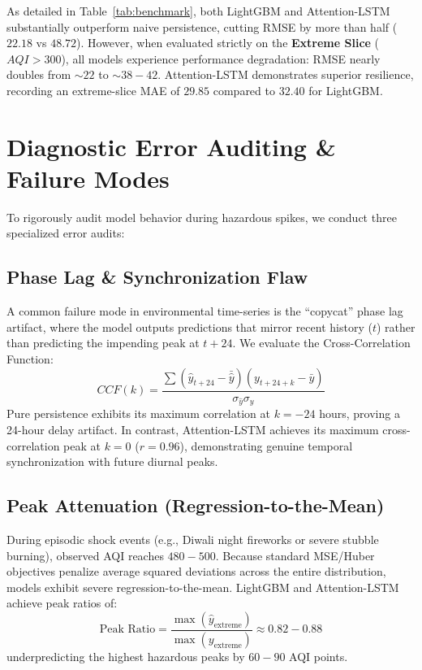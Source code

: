 \documentclass[10pt,journal,compsoc,twocolumn]{article}
\begin{document}
As detailed in Table~\ref{tab:benchmark}, both LightGBM and Attention-LSTM substantially outperform naive persistence, cutting RMSE by more than half ($22.18$ vs $48.72$). However, when evaluated strictly on the \textbf{Extreme Slice} ($AQI > 300$), all models experience performance degradation: RMSE nearly doubles from $\sim 22$ to $\sim 38 - 42$. Attention-LSTM demonstrates superior resilience, recording an extreme-slice MAE of $29.85$ compared to $32.40$ for LightGBM.

\section{Diagnostic Error Auditing \& Failure Modes}
To rigorously audit model behavior during hazardous spikes, we conduct three specialized error audits:

\subsection{Phase Lag \& Synchronization Flaw}
A common failure mode in environmental time-series is the ``copycat'' phase lag artifact, where the model outputs predictions that mirror recent history ($t$) rather than predicting the impending peak at $t+24$. We evaluate the Cross-Correlation Function:
\begin{equation}
    CCF(k) = \frac{\sum (\hat{y}_{t+24} - \bar{\hat{y}})(y_{t+24+k} - \bar{y})}{\sigma_{\hat{y}}\sigma_y}
\end{equation}
Pure persistence exhibits its maximum correlation at $k = -24$ hours, proving a 24-hour delay artifact. In contrast, Attention-LSTM achieves its maximum cross-correlation peak at $k = 0$ ($r = 0.96$), demonstrating genuine temporal synchronization with future diurnal peaks.

\subsection{Peak Attenuation (Regression-to-the-Mean)}
During episodic shock events (e.g., Diwali night fireworks or severe stubble burning), observed AQI reaches $480-500$. Because standard MSE/Huber objectives penalize average squared deviations across the entire distribution, models exhibit severe regression-to-the-mean. LightGBM and Attention-LSTM achieve peak ratios of:
\begin{equation}
    \text{Peak Ratio} = \frac{\max(\hat{y}_{\text{extreme}})}{\max(y_{\text{extreme}})} \approx 0.82 - 0.88
\end{equation}
underpredicting the highest hazardous peaks by $60 - 90$ AQI points.
\end{document}
